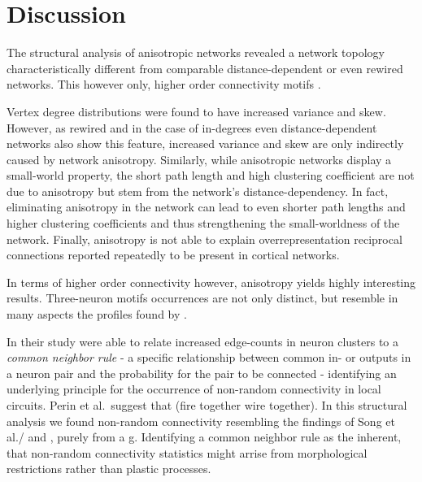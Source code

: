 

\section{Discussion}\label{sec:discussion}

The structural analysis of anisotropic networks revealed a network
topology characteristically different from comparable
distance-dependent or even rewired networks. This however only, higher
order connectivity motifs .

Vertex degree distributions were found to have increased variance and
skew. However, as rewired and in the case of in-degrees even
distance-dependent networks also show this feature, increased variance
and skew are only indirectly caused by network anisotropy. Similarly,
while an\-iso\-tro\-pic networks display a small-world property, the
short path length and high clustering coefficient are not due to
anisotropy but stem from the network's distance-dependency. In fact,
eliminating anisotropy in the network can lead to even shorter path
lengths and higher clustering coefficients and thus strengthening the
small-worldness of the network. Finally, anisotropy is not able to
explain overrepresentation reciprocal connections reported repeatedly
to be present in cortical networks.

In terms of higher order connectivity however, anisotropy yields
highly interesting results. Three-neuron motifs occurrences are not
only distinct, but resemble in many aspects the profiles found by
\textcite{Song2005}. 


 
In their study \textcite{Perin2011} were able to relate increased
edge-counts in neuron clusters to a \textit{common neighbor rule} - a
specific relationship between common in- or outputs in a neuron pair
and the probability for the pair to be connected - identifying an
underlying principle for the occurrence of non-random connectivity in
local circuits. Perin et al.\ suggest that (fire together wire
together). In this structural analysis we found non-random
connectivity resembling the findings of Song et al./ and , purely from
a g. Identifying a common neighbor rule as the inherent, that
non-random connectivity statistics might arrise from morphological
restrictions rather than plastic processes.








